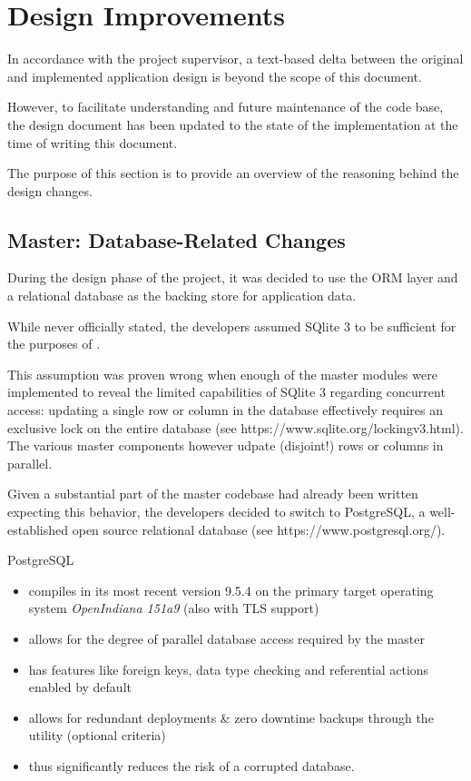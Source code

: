 \section{Design Improvements}

In accordance with the project supervisor, a text-based delta between the original and implemented application design
is beyond the scope of this document.

However, to facilitate understanding and future maintenance of the code base, the design document has been updated to the state of
the implementation at the time of writing this document.

The purpose of this section is to provide an overview of the reasoning behind the design changes.


\subsection{Master: Database-Related Changes}

During the design phase of the project, it was decided to use the  ORM layer and a relational database as the backing store
for \mamid application data.

While never officially stated, the developers assumed SQlite 3 to be sufficient for the purposes of \mamid.

This assumption was proven wrong when enough of the master modules were implemented to reveal the limited capabilities of SQlite 3 regarding
concurrent access: updating a single row or column in the database effectively requires an exclusive lock on the entire database (see https://www.sqlite.org/lockingv3.html).
The various master components however udpate (disjoint!) rows or columns in parallel.

Given a substantial part of the master codebase had already been written expecting this behavior, the developers decided to switch to
PostgreSQL, a well-established open source relational database (see https://www.postgresql.org/).

PostgreSQL
\begin{itemize}
\item compiles in its most recent version 9.5.4 on the primary target operating system \textit{OpenIndiana 151a9} (also with TLS support)
\item allows for the degree of parallel database access required by the master
\item has features like foreign keys, data type checking and referential actions enabled by default %
\item allows for redundant deployments \& zero downtime backups through the  utility (optional criteria) %
\item thus significantly reduces the risk of a corrupted database.
\end{itemize}

